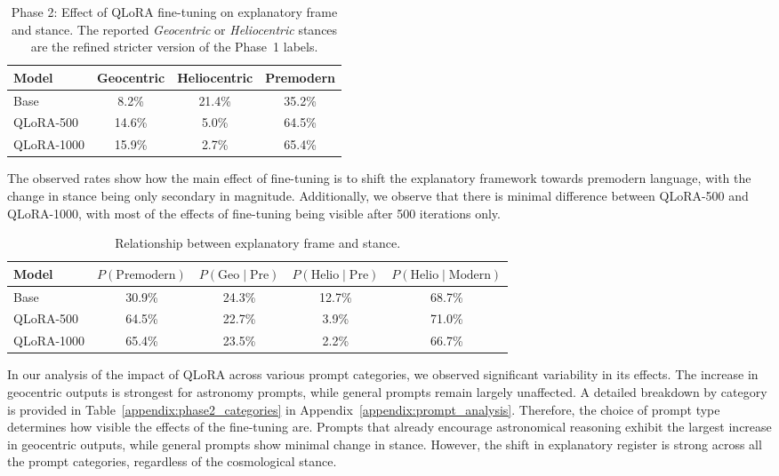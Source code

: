 \begin{table}[t]
\centering
\caption{Phase 2: Effect of QLoRA fine-tuning on explanatory frame and stance. The reported \textit{Geocentric} or \textit{Heliocentric} stances are the refined stricter version of the Phase~1 labels.}
\label{tab:phase2_summary}

\begin{tabular}{lccc}
\hline
Model & Geocentric & Heliocentric & Premodern \\
\hline
Base & 8.2\% & 21.4\% & 35.2\% \\
QLoRA-500 & 14.6\% & 5.0\% & 64.5\% \\
QLoRA-1000 & 15.9\% & 2.7\% & 65.4\% \\
\hline
\end{tabular}
\end{table}

The observed rates show how the main effect of fine-tuning is to shift the explanatory framework towards premodern language, with the change in stance being only secondary in magnitude. Additionally, we observe that there is minimal difference between QLoRA-500 and QLoRA-1000, with most of the effects of fine-tuning being visible after 500 iterations only.

\begin{table}[h]
\centering
\caption{Relationship between explanatory frame and stance.}
\label{tab:frame_stance_conditionals}
\begin{tabular}{lcccc}
\hline
Model & $P(\mathrm{Premodern})$ & $P(\mathrm{Geo}\mid\mathrm{Pre})$ & $P(\mathrm{Helio}\mid\mathrm{Pre})$ & $P(\mathrm{Helio}\mid\mathrm{Modern})$ \\
\hline
Base & 30.9\% & 24.3\% & 12.7\% & 68.7\% \\
QLoRA-500 & 64.5\% & 22.7\% & 3.9\% & 71.0\% \\
QLoRA-1000 & 65.4\% & 23.5\% & 2.2\% & 66.7\% \\
\hline
\end{tabular}
\end{table}

In our analysis of the impact of QLoRA across various prompt categories, we observed significant variability in its effects. The increase in geocentric outputs is strongest for astronomy prompts, while general prompts remain largely unaffected. A detailed breakdown by category is provided in Table~\ref{appendix:phase2_categories} in Appendix~\ref{appendix:prompt_analysis}. Therefore, the choice of prompt type determines how visible the effects of the fine-tuning are. Prompts that already encourage astronomical reasoning exhibit the largest increase in geocentric outputs, while general prompts show minimal change in stance. However, the shift in explanatory register is strong across all the prompt categories, regardless of the cosmological stance.

